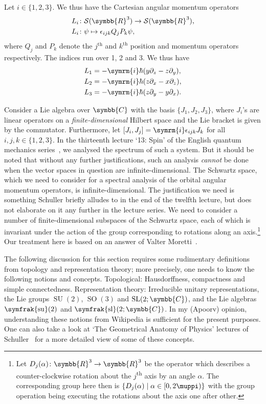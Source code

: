 \documentclass[12pt, a4 paper]{article}
\let\symcal\mathcal
\theoremstyle{definition}
\newcommand{\position}{Q}
\newcommand{\momentum}{P}
\newcommand{\rthree}{\symbb{R}^3}
\newcommand{\rr}{\symbb{R}}
\newcommand{\cc}{\symbb{C}}
\newcommand{\schwartz}{\symcal{S}}
\newcommand{\schwartzrthree}{\schwartz(\rr^3)}
\renewcommand{\i}{\symrm{i}}
\renewcommand{\pi}{\muppi}
\newcommand{\levi}{\epsilon_{ijk}}
\newcommand{\sutwo}{\operatorname{\symfrak{su}}(2)}
\newcommand{\sltwoc}{\operatorname{\symfrak{sl}}(2;\cc)}
\newcommand{\SUtwo}{\operatorname{SU}(2)}
\newcommand{\SOthree}{\operatorname{SO}(3)}
\begin{document}
    Let $i \in \{1,2,3\}$. We thus have the Cartesian angular momentum operators
    \begin{align*}
        L_i &\colon \schwartzrthree \rightarrow \schwartzrthree,\\
        L_i &\colon \psi \mapsto \levi\position_j\momentum_k\psi,
    \end{align*}
    where $\position_j$ and $\momentum_k$ denote the $j^\text{th}$ and $k^\text{th}$ position and momentum operators respectively. The indices run over 1, 2 and 3.
    We thus have
    \begin{align*}
        L_1 &= -\i\hbar(y\partial_z - z\partial_y),\\
        L_2 &= -\i\hbar(z\partial_x - x\partial_z),\\
        L_3 &= -\i\hbar(z\partial_y - y\partial_x).
    \end{align*}

    Consider a Lie algebra over \(\cc\) with the basis \(\{J_1, J_2, J_3\}\), where \(J_i\)'s are linear operators on a \textit{finite-dimensional} Hilbert space and the Lie bracket is given by the commutator. Furthermore, let \([J_i, J_j] = \i \epsilon_{ijk} J_k\) for all \(i, j, k \in \{1, 2, 3\}\). In the thirteenth lecture `13: Spin' of the English quantum mechanics series~\cite{Schuller, SchullerVideos}, we analysed the spectrum of such a system. But it should be noted that without any further justifications, such an analysis \textit{cannot} be done when the vector spaces in question are infinite-dimensional. The Schwartz space, which we need to consider for a spectral analysis of the orbital angular momentum operators, is infinite-dimensional. The justification we need is something Schuller briefly alludes to in the end of the twelfth lecture, but does not elaborate on it any further in the lecture series. We need to consider a number of finite-dimensional subspaces of the Schwartz space, each of which is invariant under the action of the group corresponding to rotations along an axis.\footnote{Let \(D_j(\alpha) \colon \rthree \rightarrow \rthree\) be the operator which describes a counter-clockwise rotation about the \(j\)\textsuperscript{th} axis by an angle \(\alpha\). The corresponding group here then is \(\{D_j(\alpha) \mid \alpha \in [0, 2\pi)\}\) with the group operation being executing the rotations about the axis one after other.} Our treatment here is based on an answer of Valter Moretti~\cite{MorettiPeter}.

    The following discussion for this section requires some rudimentary definitions from topology and representation theory; more precisely, one needs to know the following notions and concepts. Topological: Hausdorffness, compactness and simple connectedness. Representation theory: Irreducible unitary representations, the Lie groups \(\SUtwo\), \(\SOthree\) and \(\operatorname{SL}(2;\cc)\), and the Lie algebras \(\sutwo\) and \(\sltwoc\). In my (Apoorv) opinion, understanding these notions from Wikipedia is sufficient for the present purposes. One can also take a look at `The Geometrical Anatomy of Physics' lectures of Schuller~\cite{Schuller_geometric_videos, Schuller_geometric_notes} for a more detailed view of some of these concepts.
\end{document}
